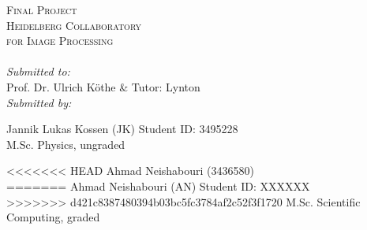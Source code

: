 \documentclass[11pt, a4paper]{scrartcl}
\makeatletter
\let\thedate\@date
\makeatother
\begin{document}
\begin{titlepage}
    \textsc{\LARGE Final Project}\\[0.5 cm]               %
    \textsc{\Large Heidelberg Collaboratory \\[0.5em] for Image Processing}\\[2.0 cm]  %
    \thedate
   	\\[3em]
    \large
            \emph{Submitted to:}\\[1em]
            Prof. Dr. Ulrich Köthe \& Tutor: Lynton\\[1cm]
            \emph{Submitted by:} \\[1.5em]
            \begin{minipage}{0.4\textwidth}            
            	\begin{flushleft} 
					\large Jannik Lukas Kossen (JK) Student ID: 3495228 \\
					\small M.Sc. Physics, ungraded\\
      		  \end{flushleft}
      		 \end{minipage}
            \begin{minipage}{0.4\textwidth}            
            	\begin{flushright} 
<<<<<<< HEAD
    	    	    \large Ahmad Neishabouri (3436580) \\ 
=======
    	    	    \large Ahmad Neishabouri (AN) Student ID: XXXXXX \\ 
>>>>>>> d421c8387480394b03bc5fc3784af2c52f3f1720
         	   		\small M.Sc. Scientific Computing, graded
      		  \end{flushright}
      		 \end{minipage}\\[2 cm]


        
 
\end{titlepage}


\tableofcontents
\pagebreak


\end{document}
